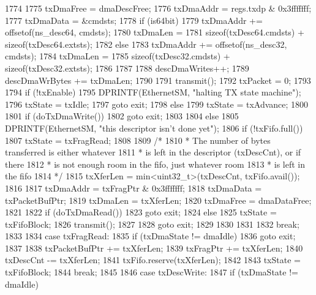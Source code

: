 \begin{DoxyCode}
{{{{1774 
1775                 txDmaFree = dmaDescFree;
1776                 txDmaAddr = regs.txdp & 0x3fffffff;
1777                 txDmaData = &cmdsts;
1778                 if (is64bit) {
1779                     txDmaAddr += offsetof(ns_desc64, cmdsts);
1780                     txDmaLen =
1781                         sizeof(txDesc64.cmdsts) + sizeof(txDesc64.extsts);
1782                 } else {
1783                     txDmaAddr += offsetof(ns_desc32, cmdsts);
1784                     txDmaLen =
1785                         sizeof(txDesc32.cmdsts) + sizeof(txDesc32.extsts);
1786                 }
1787 
1788                 descDmaWrites++;
1789                 descDmaWrBytes += txDmaLen;
1790 
1791                 transmit();
1792                 txPacket = 0;
1793 
1794                 if (!txEnable) {
1795                     DPRINTF(EthernetSM, "halting TX state machine\n");
1796                     txState = txIdle;
1797                     goto exit;
1798                 } else
1799                     txState = txAdvance;
1800 
1801                 if (doTxDmaWrite())
1802                     goto exit;
1803             }
1804         } else {
1805             DPRINTF(EthernetSM, "this descriptor isn't done yet\n");
1806             if (!txFifo.full()) {
1807                 txState = txFragRead;
1808 
1809                 /*
1810                  * The number of bytes transferred is either whatever
1811                  * is left in the descriptor (txDescCnt), or if there
1812                  * is not enough room in the fifo, just whatever room
1813                  * is left in the fifo
1814                  */
1815                 txXferLen = min<uint32_t>(txDescCnt, txFifo.avail());
1816 
1817                 txDmaAddr = txFragPtr & 0x3fffffff;
1818                 txDmaData = txPacketBufPtr;
1819                 txDmaLen = txXferLen;
1820                 txDmaFree = dmaDataFree;
1821 
1822                 if (doTxDmaRead())
1823                     goto exit;
1824             } else {
1825                 txState = txFifoBlock;
1826                 transmit();
1827 
1828                 goto exit;
1829             }
1830 
1831         }
1832         break;
1833 
1834       case txFragRead:
1835         if (txDmaState != dmaIdle)
1836             goto exit;
1837 
1838         txPacketBufPtr += txXferLen;
1839         txFragPtr += txXferLen;
1840         txDescCnt -= txXferLen;
1841         txFifo.reserve(txXferLen);
1842 
1843         txState = txFifoBlock;
1844         break;
1845 
1846       case txDescWrite:
1847         if (txDmaState != dmaIdle)
}}
\end{DoxyCode}
